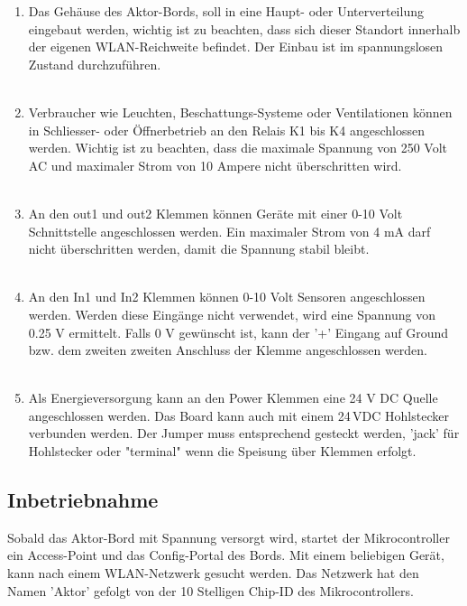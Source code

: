 \begin{enumerate}
	\item Das Gehäuse des Aktor-Bords, soll in eine Haupt- oder Unterverteilung eingebaut werden, wichtig ist zu beachten, dass sich dieser Standort innerhalb der eigenen WLAN-Reichweite befindet. Der Einbau ist im spannungslosen Zustand durchzuführen. \\
	\\
	\item Verbraucher wie Leuchten, Beschattungs-Systeme oder Ventilationen können in Schliesser- oder Öffnerbetrieb an den Relais K1 bis K4 angeschlossen werden. Wichtig ist zu beachten, dass die maximale Spannung von 250 Volt AC und maximaler Strom von 10 Ampere nicht überschritten wird.\\
		\\
	\item An den out1 und out2 Klemmen können Geräte mit einer 0-10 Volt Schnittstelle angeschlossen werden. Ein maximaler Strom von 4 mA darf nicht überschritten werden, damit die Spannung stabil bleibt.\\
	\\
	\item An den In1 und In2 Klemmen können 0-10 Volt Sensoren angeschlossen werden. Werden diese Eingänge nicht verwendet, wird eine Spannung von 0.25 V ermittelt. Falls 0 V gewünscht ist, kann der '+' Eingang auf Ground bzw. dem zweiten zweiten Anschluss der Klemme angeschlossen werden. \\
	\\
	\item Als Energieversorgung kann an den Power Klemmen eine 24 V DC Quelle angeschlossen werden. Das Board kann auch mit einem 24\,VDC Hohlstecker verbunden werden. Der Jumper muss entsprechend gesteckt werden, 'jack' für Hohlstecker oder "terminal" wenn die Speisung über Klemmen erfolgt. 
\end{enumerate}

\subsection{Inbetriebnahme}
Sobald das Aktor-Bord mit Spannung versorgt wird, startet der Mikrocontroller ein Access-Point und das Config-Portal des Bords. Mit einem beliebigen Gerät, kann nach einem WLAN-Netzwerk gesucht werden. Das Netzwerk hat den Namen 'Aktor' gefolgt von der 10 Stelligen Chip-ID des Mikrocontrollers. 
 
